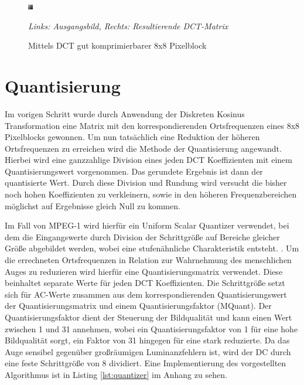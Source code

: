 \begin{figure}[h!]
    \centering
    \begin{multicols}{2}
    \includegraphics[scale=15]{images/2-2_dct_good.png}
    
    \end{multicols}
    \caption{Mittels DCT gut komprimierbarer 8x8 Pixelblock}
    \textit{Links: Ausgangsbild, Rechts: Resultierende DCT-Matrix}
    \label{fig:dct-good}
\end{figure}


\section{Quantisierung}

Im vorigen Schritt wurde durch Anwendung der Diskreten Kosinus Transformation eine Matrix mit den korrespondierenden Ortsfrequenzen eines 8x8 Pixelblocks gewonnen. Um nun tatsächlich eine Reduktion der höheren Ortsfrequenzen zu erreichen wird die Methode der Quantisierung angewandt. Hierbei wird eine ganzzahlige Division eines jeden DCT Koeffizienten mit einem Quantisierungswert vorgenommen. Das gerundete Ergebnis ist dann der quantisierte Wert. Durch diese Division und Rundung wird versucht die bisher noch hohen Koeffizienten zu verkleinern, sowie in den höheren Frequenzbereichen möglichst auf Ergebnisse gleich Null zu kommen.

Im Fall von MPEG-1 wird hierfür ein Uniform Scalar Quantizer verwendet, bei dem die Eingangswerte durch Division der Schrittgröße auf Bereiche gleicher Größe abgebildet werden, wobei eine stufenähnliche Charakteristik entsteht. \cite{symes_peter_digital_2004}. Um die errechneten Ortsfrequenzen in Relation zur Wahrnehmung des menschlichen Auges zu reduzieren wird hierfür eine Quantisierungsmatrix verwendet. Diese beinhaltet separate Werte für jeden DCT Koeffizienten. Die Schrittgröße setzt sich für AC-Werte zusammen aus dem korrespondierenden Quantisierungswert der Quantisierungsmatrix und einem Quantisierungsfaktor (MQuant). Der Quantisierungsfaktor dient der Steuerung der Bildqualität und kann einen Wert zwischen 1 und 31 annehmen, wobei ein Quantisierungsfaktor von 1 für eine hohe Bildqualität sorgt, ein Faktor von 31 hingegen für eine stark reduzierte. Da das Auge sensibel gegenüber großräumigen Luminanzfehlern ist, wird der DC durch eine feste Schrittgröße von 8 dividiert. \cite{ISO13586} Eine Implementierung des vorgestellten Algorithmus ist in Listing \ref{lst:quantizer} im Anhang zu sehen.

